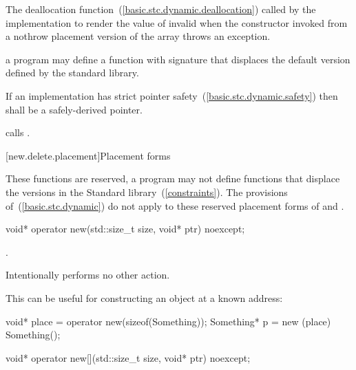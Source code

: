 \begin{itemdescr}
\pnum
\effects
The
deallocation function~(\ref{basic.stc.dynamic.deallocation})
called by the implementation
to render the value of  invalid
when the constructor invoked from a nothrow
placement version of the array  throws an exception.

\pnum
\replaceable
a \Cpp program may define a function with signature
that displaces the default version defined by the
\Cpp standard library.

\pnum
\requires
If an implementation has strict pointer safety~(\ref{basic.stc.dynamic.safety})
then  shall be a safely-derived pointer.

\pnum
{}
{} calls
.
\end{itemdescr}

[new.delete.placement]{Placement forms}

\pnum
These functions are reserved, a \Cpp program may not define functions that displace
the versions in the Standard \Cpp library~(\ref{constraints}).
The provisions of~(\ref{basic.stc.dynamic}) do not apply to these reserved
placement forms of  and .

%
\begin{itemdecl}
void* operator new(std::size_t size, void* ptr) noexcept;
\end{itemdecl}

\begin{itemdescr}
\pnum
\returns
{}.

\pnum
\remarks
Intentionally performs no other action.

\pnum
\enterexample
This can be useful for constructing an object at a known address:

\begin{codeblock}
void* place = operator new(sizeof(Something));
Something* p = new (place) Something();
\end{codeblock}
\exitexample
\end{itemdescr}

%
\begin{itemdecl}
void* operator new[](std::size_t size, void* ptr) noexcept;
\end{itemdecl}

